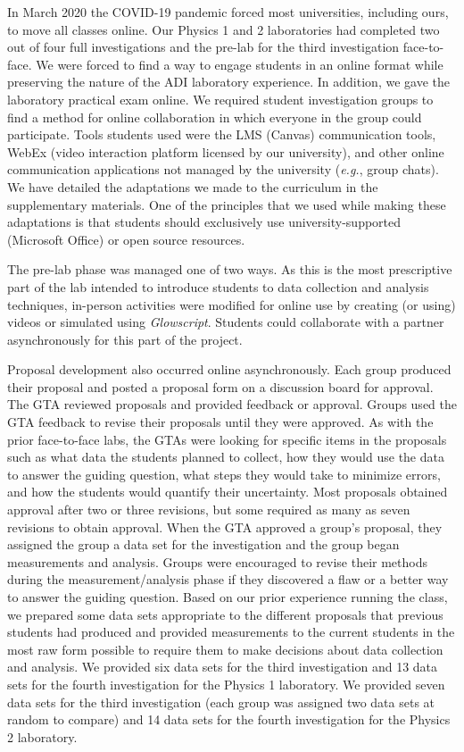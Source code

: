 \documentclass[aip, numerical, preprint]{revtex4-2}
\begin{document}
In March 2020 the COVID-19 pandemic forced most universities, including ours, to move all
classes online. Our Physics 1 and 2 laboratories had completed two out of
four full investigations and the pre-lab for the third investigation face-to-face. We were
forced to find a way to engage students in an online format while preserving the nature of the
ADI laboratory experience. In addition, we gave the laboratory practical exam online. We
required student investigation groups to find a method for online collaboration in which
everyone in the group could participate. Tools students used were the LMS (Canvas)
communication tools, WebEx (video interaction platform licensed by our university),
and other online communication applications not managed by the university (\emph{e.g.}, group
chats). We have detailed the adaptations we made to the curriculum in the supplementary
materials.  One of the principles that we used while making these adaptations is that students
should exclusively use university-supported (Microsoft Office) or open source resources.

The pre-lab phase was managed one of two ways.  As this is the most prescriptive part of the lab 
intended to introduce students to data collection and analysis techniques, in-person
activities were modified for online use by creating (or using) videos or simulated using
\emph{Glowscript}.\citep{glowscript} Students could collaborate with a partner asynchronously
for this part of the project.

Proposal development also occurred online asynchronously.  Each group produced their proposal
and posted a proposal form on a discussion board for approval. The GTA reviewed proposals and
provided feedback or approval. Groups used the GTA feedback to revise their proposals until
they were approved. As with the prior face-to-face labs, the GTAs were looking for specific items in 
the proposals such as what data the students planned to collect, how they would use the data to 
answer the guiding question, what steps they would take to minimize errors, and how the students 
would quantify their uncertainty. Most proposals obtained approval after two or three revisions, but 
some required as many as seven revisions to obtain approval. When the GTA approved a group's
proposal, they assigned the group a data set for the investigation and the group began
measurements and analysis. Groups were encouraged to revise their methods during the  
measurement/analysis phase if they discovered a flaw or a better way to answer the guiding question. 
Based on our prior experience running the class, we prepared some
data sets appropriate to the different proposals that previous students had produced and
provided measurements to the current students in the most raw form possible to require them to
make decisions about data collection and analysis. We provided six data sets for the third investigation 
and 13 data sets for the fourth investigation for the Physics 1 laboratory. We provided seven data sets 
for the third investigation (each group was assigned two data sets at random to compare) and 14 data 
sets for the fourth investigation for the Physics 2 laboratory.
\end{document}
